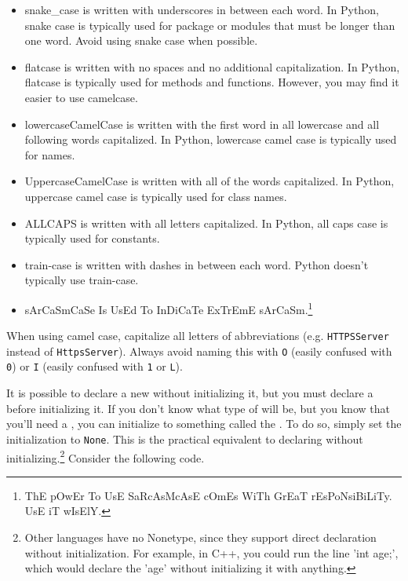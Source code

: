 \begin{itemize}
    \item snake\_case is written with underscores in between each word. In Python, snake case is typically used for package or modules that must be longer than one word. Avoid using snake case when possible.
    \item flatcase is written with no spaces and no additional capitalization. In Python, flatcase is typically used for methods and functions. However, you may find it easier to use camelcase.
    \item lowercaseCamelCase is written with the first word in all lowercase and all following words capitalized. In Python, lowercase camel case is typically used for  names.
    \item UppercaseCamelCase is written with all of the words capitalized. In Python, uppercase camel case is typically used for class names.
    \item ALLCAPS is written with all letters capitalized. In Python, all caps case is typically used for constants.
    \item train-case is written with dashes in between each word. Python doesn't typically use train-case.
    \item sArCaSmCaSe Is UsEd To InDiCaTe ExTrEmE sArCaSm.\footnote{ThE pOwEr To UsE SaRcAsMcAsE cOmEs WiTh GrEaT rEsPoNsiBiLiTy. UsE iT wIsElY.}
\end{itemize}
When using camel case, capitalize all letters of abbreviations (e.g. \verb|HTTPSServer| instead of \verb|HttpsServer|). Always avoid naming this with \verb|O| (easily confused with \verb|0|) or \verb|I| (easily confused with \verb|1| or \verb|L|). \par
It is possible to declare a new  without initializing it, but you must declare a  before initializing it. If you don't know what type of  will be, but you know that you'll need a , you can initialize to something called the . To do so, simply set the initialization to \verb|None|. This is the practical equivalent to declaring without initializing.\footnote{Other languages have no Nonetype, since they support direct declaration without initialization. For example, in C++, you could run the line 'int age;', which would declare the 'age'  without initializing it with anything.} Consider the following code.\par
